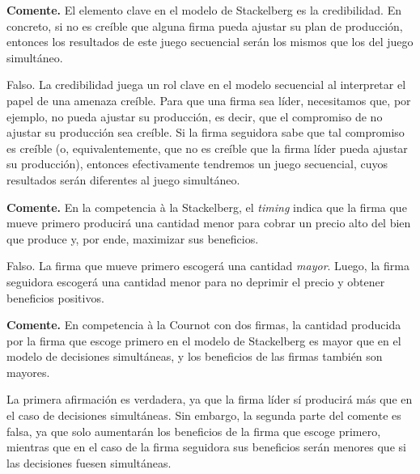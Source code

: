 \question \textbf{Comente.} El elemento clave en el modelo de Stackelberg es la credibilidad. En concreto, si no es creíble que alguna firma pueda ajustar su plan de producción, entonces los resultados de este juego secuencial serán los mismos que los del juego simultáneo.
\begin{solution}
Falso. La credibilidad juega un rol clave en el modelo secuencial al interpretar el papel de una amenaza creíble. Para que una firma sea líder, necesitamos que, por ejemplo, no pueda ajustar su producción, es decir, que el compromiso de no ajustar su producción sea creíble. Si la firma seguidora sabe que tal compromiso es creíble (o, equivalentemente, que no es creíble que la firma líder pueda ajustar su producción), entonces efectivamente tendremos un juego secuencial, cuyos resultados serán diferentes al juego simultáneo.

\end{solution}

\question \textbf{Comente.} En la competencia à la Stackelberg, el \emph{timing} indica que la firma que mueve primero producirá una cantidad menor para cobrar un precio alto del bien que produce y, por ende, maximizar sus beneficios.
\begin{solution}
Falso. La firma que mueve primero escogerá una cantidad \emph{mayor}. Luego, la firma seguidora escogerá una cantidad menor para no deprimir el precio y obtener beneficios positivos.

\end{solution}

\question \textbf{Comente.} En competencia à la Cournot con dos firmas, la cantidad producida por la firma que escoge primero en el modelo de Stackelberg es mayor que en el modelo de decisiones simultáneas, y los beneficios de las firmas también son mayores.
\begin{solution}
La primera afirmación es verdadera, ya que la firma líder sí producirá más que en el caso de decisiones simultáneas. Sin embargo, la segunda parte del comente es falsa, ya que solo aumentarán los beneficios de la firma que escoge primero, mientras que en el caso de la firma seguidora sus beneficios serán menores que si las decisiones fuesen simultáneas.

\end{solution}

